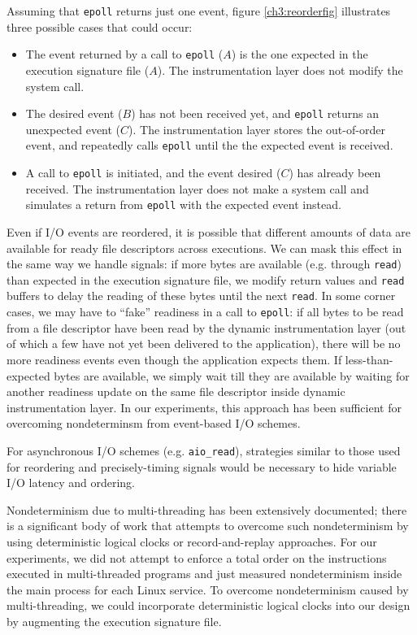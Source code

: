 Assuming that \texttt{epoll} returns just one event, figure
\ref{ch3:reorderfig} illustrates three possible cases that could occur:
\begin{itemize}
    \item The event returned by a call to \texttt{epoll} ($A$) is the one expected
    in the execution signature file ($A$). The instrumentation layer
    does not modify the system call.
    \item The desired event ($B$) has not been received yet,
    and \texttt{epoll} returns an unexpected event ($C$).
    The instrumentation layer stores the out-of-order event,
    and repeatedly calls \texttt{epoll} until the 
    the expected event is received.
    \item  A call to \texttt{epoll} is initiated, and the
    event desired ($C$) has already been received.
    The instrumentation layer does not 
    make a system call and simulates a return
    from \texttt{epoll} with the expected event instead.
\end{itemize}

Even if I/O events are reordered,
it is possible that different amounts
of data are available for ready
file descriptors across executions. We can 
mask this effect in the same
way we handle signals: if more bytes
are available (e.g. through \texttt{read}) 
than expected in the execution signature
file, we modify return values and \texttt{read}
buffers to delay the reading of these bytes
until the next \texttt{read}. In some corner
cases, we may have to ``fake'' readiness
in a call to \texttt{epoll}: if all bytes to be read from
a file descriptor have been read by 
the dynamic instrumentation layer (out of which
a few have not yet been delivered to the application),
there will be no more readiness events even
though the application expects them. If less-than-expected
bytes are available, we simply wait
till they are available by waiting for
another readiness update on the same file descriptor inside 
dynamic instrumentation layer.
In our experiments, this approach has been sufficient 
for overcoming nondeterminsm from event-based I/O
schemes.

For asynchronous I/O schemes (e.g. \texttt{aio\_read}), strategies
similar to those used for reordering
and precisely-timing signals would be necessary to hide
variable I/O latency and ordering.
\newline

 \newline
Nondeterminism due to multi-threading
has been extensively documented; there
is a significant body of work that
attempts to overcome such nondeterminism
by using deterministic logical clocks
or record-and-replay approaches. 
For our experiments, we did not attempt to enforce
a total order on the instructions executed in multi-threaded
programs and just measured nondeterminism inside 
the main process for each Linux service.
To overcome nondeterminism caused
by multi-threading, we could incorporate
deterministic logical clocks 
into our design by augmenting the
execution signature file.

